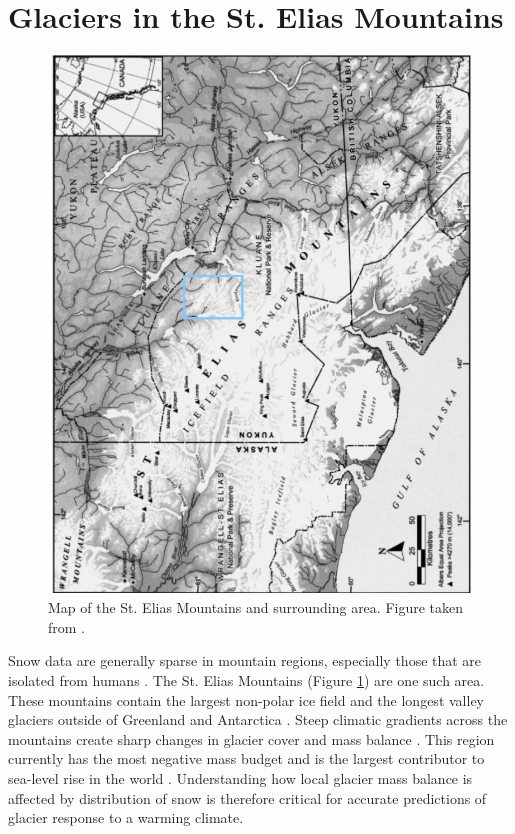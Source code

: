 \documentclass{sfuthesis}
\begin{document}
\section{Glaciers in the St. Elias Mountains}
\begin{figure}
 \centering
      \includegraphics[width=\textwidth]{stelias.png}
  \caption{Map of the St. Elias Mountains and surrounding area. Figure taken from \cite{Danby2003}.}
        \label{map}
\end{figure}

Snow data are generally sparse in mountain regions, especially those that are isolated from humans \citep{Marcus1970}. The St. Elias Mountains (Figure \ref{map}) are one such area. These mountains contain the largest non-polar ice field and the longest valley glaciers outside of Greenland and Antarctica \citep{Marcus1970, Danby2003}. Steep climatic gradients across the mountains create sharp changes in glacier cover and mass balance \citep{Clarke2002}. This region currently has the most negative mass budget and is the largest contributor to sea-level rise in the world \citep{Kaser2006, Gardner2013}. Understanding how local glacier mass balance is affected by distribution of snow is therefore critical for accurate predictions of glacier response to a warming climate. 
\end{document}
